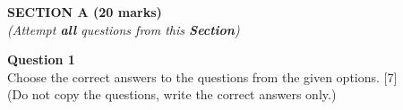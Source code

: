 \begin{center}
   \large
   \textbf{SECTION A (20 marks)}\\
   \vspace{5mm}
   \normalsize
   \textit{(Attempt \textbf{all} questions from this \textbf{Section})}
\end{center}
\par
\noindent
\textbf{Question 1}\\
Choose the correct answers to the questions from the given options. \hfill [7]\\
(Do not copy the questions, write the correct answers only.)
\par
\vspace{2mm}
